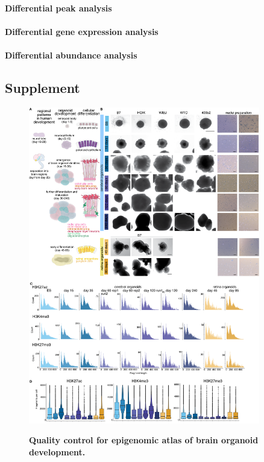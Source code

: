 \paragraph{Differential peak analysis}

\paragraph{Differential gene expression analysis}

\paragraph{Differential abundance analysis}









\clearpage

\subsection{Supplement}
\beginsupplement

\begin{figure}[h!]
    \centering
	\includegraphics[width=0.9\textwidth]{figures/cnt/Figure_S1}
    \label{fig:regS1}
    \caption{\textbf{Quality control for epigenomic atlas of brain organoid development.}}
\end{figure}


